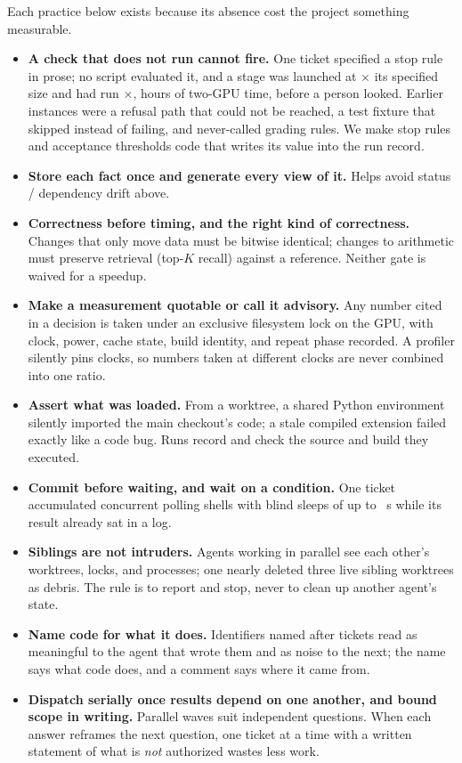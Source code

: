 Each practice below exists because its absence cost the project something
measurable.
\begin{itemize}
 \item \textbf{A check that does not run cannot fire.} One ticket specified a
 stop rule in prose; no script evaluated it, and a stage was launched at
 \StopRulePlannedOverrunFactor$\times$ its specified size and had run
 \StopRuleExecutedOverrunFactor$\times$, \StopRuleOverrunHours{} hours of
 two-GPU time, before a person looked. Earlier instances were a
 refusal path that could not be reached, a test fixture that skipped instead of
 failing, and never-called grading rules. We make stop rules and
 acceptance thresholds code that writes its value into the run record.
 \item \textbf{Store each fact once and generate every view of it.} Helps avoid
 status / dependency drift above.
 \item \textbf{Correctness before timing, and the right kind of correctness.}
 Changes that only move data must be bitwise identical; changes to arithmetic
 must preserve retrieval (top-$K$ recall) against a reference. Neither gate is
 waived for a speedup.
 \item \textbf{Make a measurement quotable or call it advisory.} Any number
 cited in a decision is taken under an exclusive filesystem lock on the GPU, with
 clock, power, cache state, build identity, and repeat phase recorded. A
 profiler silently pins clocks, so numbers taken at different clocks are never
 combined into one ratio.
 \item \textbf{Assert what was loaded.} From a worktree, a shared Python
 environment silently imported the main checkout's code; a stale compiled
 extension failed exactly like a code bug. Runs record and check the source and
 build they executed.
 \item \textbf{Commit before waiting, and wait on a condition.} One ticket
 accumulated \WaiterShellCount{} concurrent polling shells with blind sleeps of
 up to \BlindSleepMaxSeconds~s while its result already sat in a log.
 \item \textbf{Siblings are not intruders.} Agents working in parallel see each
 other's worktrees, locks, and processes; one nearly deleted three live sibling
 worktrees as debris. The rule is to report and stop, never to clean up another
 agent's state.
 \item \textbf{Name code for what it does.} Identifiers named after tickets read
 as meaningful to the agent that wrote them and as noise to the next; the name
 says what code does, and a comment says where it came from.
 \item \textbf{Dispatch serially once results depend on one another, and bound
 scope in writing.} Parallel waves suit independent questions. When each answer
 reframes the next question, one ticket at a time with a written statement of
 what is \emph{not} authorized wastes less work.
\end{itemize}


